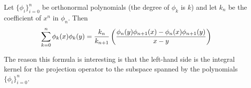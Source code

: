 \documentclass[12pt]{article}
\begin{document}
Let $\{\phi_i\}_{i=0}^n$ be orthonormal polynomials (the degree of $\phi_k$ is $k$) and let $k_n$ be the coefficient of $x^n$ in $\phi_n$.  Then
 \[\sum_{k=0}^n \phi_k (x) \phi_k (y) = {k_n \over k_{n+1}}
 \left({\phi_n (y) \phi_{n+1} (x) - \phi_n (x) \phi_{n+1} (y) \over
  x - y}\right)\]

The reason this formula is interesting is that the left-hand side is
the integral kernel for the projection operator to the subspace spanned
by the polynomials $\{\phi_i\}_{i=0}^n$.
\end{document}
